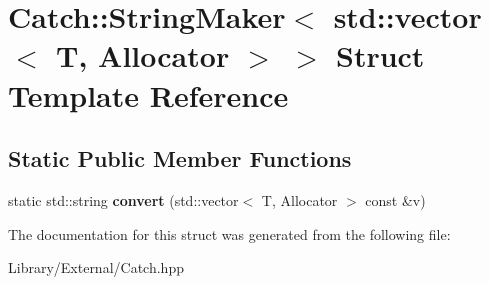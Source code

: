 \hypertarget{struct_catch_1_1_string_maker_3_01std_1_1vector_3_01_t_00_01_allocator_01_4_01_4}{}\section{Catch\+:\+:String\+Maker$<$ std\+:\+:vector$<$ T, Allocator $>$ $>$ Struct Template Reference}
\label{struct_catch_1_1_string_maker_3_01std_1_1vector_3_01_t_00_01_allocator_01_4_01_4}
\subsection*{Static Public Member Functions}
\begin{DoxyCompactItemize}
\item 
\hypertarget{struct_catch_1_1_string_maker_3_01std_1_1vector_3_01_t_00_01_allocator_01_4_01_4_adc7dc716733cea8777497257ae22e62d}{}static std\+::string {\bfseries convert} (std\+::vector$<$ T, Allocator $>$ const \&v)\label{struct_catch_1_1_string_maker_3_01std_1_1vector_3_01_t_00_01_allocator_01_4_01_4_adc7dc716733cea8777497257ae22e62d}

\end{DoxyCompactItemize}


The documentation for this struct was generated from the following file\+:\begin{DoxyCompactItemize}
\item 
Library/\+External/Catch.\+hpp\end{DoxyCompactItemize}
